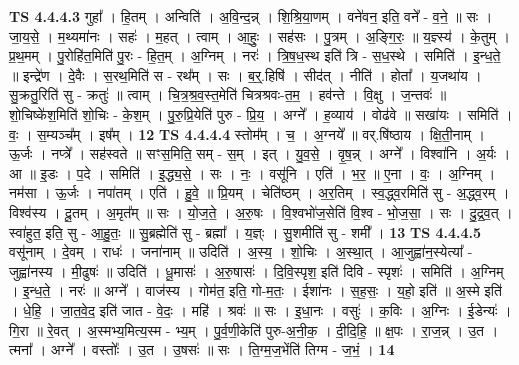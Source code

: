 \documentclass[17pt]{extarticle}
\begin{document}
                  \newline
                                \textbf{ TS 4.4.4.3} \newline
                  गुहा᳚ । हि॒तम् । अन्विति॑ । अ॒वि॒न्द॒न्न् । शि॒श्रि॒या॒णम् । वने॑वन॒ इति॒ वने᳚ - व॒ने॒ ॥ सः । जा॒य॒से॒ । म॒थ्यमा॑नः । सहः॑ । म॒हत् । त्वाम् । आ॒हुः॒ । सह॑सः । पु॒त्रम् । अ॒ङ्गि॒रः॒ ॥ य॒ज्ञ्स्य॑ । के॒तुम् । प्र॒थ॒मम् । पु॒रोहि॑त॒मिति॑ पु॒रः - हि॒त॒म् । अ॒ग्निम् । नरः॑ । त्रि॒ष॒ध॒स्थ इति॑ त्रि - स॒ध॒स्थे । समिति॑ । इ॒न्ध॒ते॒ ॥ इन्द्रे॑ण । दे॒वैः । स॒रथ॒मिति॑ स - रथ᳚म् । सः । ब॒र्॒.हिषि॑ । सीद॑त् । नीति॑ । होता᳚ । य॒जथा॑य । सु॒क्रतु॒रिति॑ सु - क्रतुः॑ ॥ त्वाम् । चि॒त्र॒श्र॒व॒स्त॒मेति॑ चित्रश्रवः-त॒म॒ । हव॑न्ते । वि॒क्षु । ज॒न्तवः॑ ॥ शो॒चिष्के॑श॒मिति॑ शो॒चिः - के॒श॒म् । पु॒रु॒प्रि॒येति॑ पुरु - प्रि॒य॒ । अग्ने᳚ । ह॒व्याय॑ । वोढ॑वे ॥ सखा॑यः । समिति॑ । वः॒ । स॒म्यञ्च᳚म् । इष᳚म् । \textbf{  12} \newline
                  \newline
                                \textbf{ TS 4.4.4.4} \newline
                  स्तोम᳚म् । च॒ । अ॒ग्नये᳚ ॥ वर्.षि॑ष्ठाय । क्षि॒ती॒नाम् । ऊ॒र्जः । नप्त्रे᳚ । सह॑स्वते ॥ सꣳस॒मिति॒ सम् - स॒म् । इत् । यु॒व॒से॒ । वृ॒ष॒न्न् । अग्ने᳚ । विश्वा॑नि । अ॒र्यः । आ ॥ इ॒डः । प॒दे । समिति॑ । इ॒द्ध्य॒से॒ । सः । नः॒ । वसू॑नि । एति॑ । भ॒र॒ ॥ ए॒ना । वः॒ । अ॒ग्निम् । नम॑सा । ऊ॒र्जः । नपा॑तम् । एति॑ । हु॒वे॒ ॥ प्रि॒यम् । चेति॑ष्ठम् । अ॒र॒तिम् । स्व॒द्ध्व॒रमिति॑ सु - अ॒द्ध्व॒रम् । विश्व॑स्य । दू॒तम् । अ॒मृत᳚म् ॥ सः । यो॒ज॒ते॒ । अ॒रु॒षः । वि॒श्वभो॑ज॒सेति॑ वि॒श्व - भो॒ज॒सा॒ । सः । दु॒द्र॒व॒त् । स्वा॑हुत॒ इति॒ सु - आ॒हु॒तः॒ ॥ सु॒ब्रह्मेति॑ सु - ब्रह्मा᳚ । य॒ज्ञ्ः । सु॒शमीति॑ सु - शमी᳚ । \textbf{  13} \newline
                  \newline
                                \textbf{ TS 4.4.4.5} \newline
                  वसू॑नाम् । दे॒वम् । राधः॑ । जना॑नाम् ॥ उदिति॑ । अ॒स्य॒ । शो॒चिः । अ॒स्था॒त् । आ॒जुह्वा॑न॒स्येत्या᳚ - जुह्वा॑नस्य । मी॒ढुषः॑ ॥ उदिति॑ । धू॒मासः॑ । अ॒रु॒षासः॑ । दि॒वि॒स्पृश॒ इति॑ दिवि - स्पृशः॑ । समिति॑ । अ॒ग्निम् । इ॒न्ध॒ते॒ । नरः॑ ॥ अग्ने᳚ । वाज॑स्य । गोम॑त॒ इति॒ गो-म॒तः॒ । ईशा॑नः । स॒ह॒सः॒ । य॒हो॒ इति॑ ॥ अ॒स्मे इति॑ । धे॒हि॒ । जा॒त॒वे॒द॒ इति॑ जात - वे॒दः॒ । महि॑ । श्रवः॑ ॥ सः । इ॒धा॒नः । वसुः॑ । क॒विः । अ॒ग्निः । ई॒डेन्यः॑ । गि॒रा ॥ रे॒वत् । अ॒स्मभ्य॒मित्य॒स्म - भ्य॒म् । पु॒र्व॒णी॒केति॑ पुरु-अ॒नी॒क॒ । दी॒दि॒हि॒ ॥ क्ष॒पः । रा॒ज॒न्न् । उ॒त । त्मना᳚ । अग्ने᳚ । वस्तोः᳚ । उ॒त । उ॒षसः॑ ॥ सः । ति॒ग्म॒ज॒भेंति॑ तिग्म - ज॒भं॒ । \textbf{  14} \newline
\end{document}
